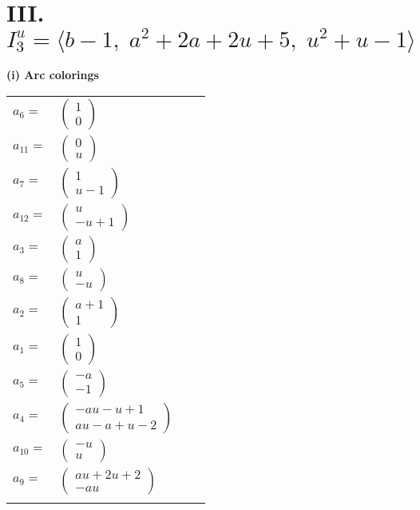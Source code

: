 \documentclass[1p]{elsarticle_modified}
\theoremstyle{definition}
\begin{document}
\centering \section*{III. $I^u_{3}= \langle b-1,\;a^2+2 a+2 u+5,\;u^2+u-1 \rangle$}
\flushleft \textbf{(i) Arc colorings}\\
\begin{tabular}{m{7pt} m{180pt} m{7pt} m{180pt} }
\flushright $a_{6}=$&$\begin{pmatrix}1\\0\end{pmatrix}$ \\
\flushright $a_{11}=$&$\begin{pmatrix}0\\u\end{pmatrix}$ \\
\flushright $a_{7}=$&$\begin{pmatrix}1\\u-1\end{pmatrix}$ \\
\flushright $a_{12}=$&$\begin{pmatrix}u\\- u+1\end{pmatrix}$ \\
\flushright $a_{3}=$&$\begin{pmatrix}a\\1\end{pmatrix}$ \\
\flushright $a_{8}=$&$\begin{pmatrix}u\\- u\end{pmatrix}$ \\
\flushright $a_{2}=$&$\begin{pmatrix}a+1\\1\end{pmatrix}$ \\
\flushright $a_{1}=$&$\begin{pmatrix}1\\0\end{pmatrix}$ \\
\flushright $a_{5}=$&$\begin{pmatrix}- a\\-1\end{pmatrix}$ \\
\flushright $a_{4}=$&$\begin{pmatrix}- a u- u+1\\a u- a+u-2\end{pmatrix}$ \\
\flushright $a_{10}=$&$\begin{pmatrix}- u\\u\end{pmatrix}$ \\
\flushright $a_{9}=$&$\begin{pmatrix}a u+2 u+2\\- a u\end{pmatrix}$\\&\end{tabular}
\end{document}

